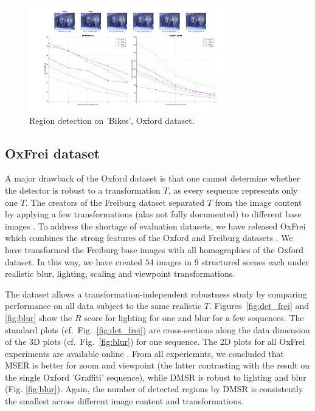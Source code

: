 \documentclass[conference,compsoc]{IEEEtran}
\begin{document}
\begin{figure}[htb]
\centering
\begin{minipage}[b]{.99\linewidth}
  \centering
  \centerline{\includegraphics[width=8.5cm]{repeatability_all_affine_bikes_blur}}
\end{minipage}
\hfill
\caption{Region detection on 'Bikes', Oxford dataset.}
\label{fig:det_bikes}
%
\end{figure}


\subsection{OxFrei dataset}
\label{ssec:combined}
A major drawback of the Oxford dataset is that one cannot determine whether the detector is robust to a transformation $T$, as every sequence represents only one $T$. The creators of the Freiburg dataset separated $T$ from the image content by applying a few transformations (alas not fully documented) to different base images \cite{FischerDB14}. To address the shortage of evaluation datasets, we have released OxFrei which combines the strong features of the Oxford and Freiburg datasets \cite{elena_ranguelova_2016_45156}. We have transformed the Freiburg base images with all homographies of the Oxford dataset. In this way, we have created $54$ images in $9$ structured scenes each under realistic blur, lighting, scaling and viewpoint transformations.

The dataset allows a transformation-independent robustness study by comparing performance on all data subject to the same realistic $T$. Figures~\ref{fig:det_frei} and \ref{fig:blur} show the $R$ score for lighting for one and blur for a few sequences. The standard plots (cf.~Fig.~\ref{fig:det_frei}) are cross-sections along the data dimension of the 3D plots (cf.~Fig.~\ref{fig:blur}) for one sequence. The 2D plots for all OxFrei experiments are available online \cite{elena_ranguelova_2016_45156}. From all experiemnts, we concluded that MSER is better for zoom and viewpoint (the latter contrasting with the result on the single Oxford 'Graffiti' sequence), while DMSR is robust to lighting and blur (Fig. \ref{fig:blur}). Again, the number of detected regions by DMSR is consistently the smallest across different image content and transformations.
\end{document}
